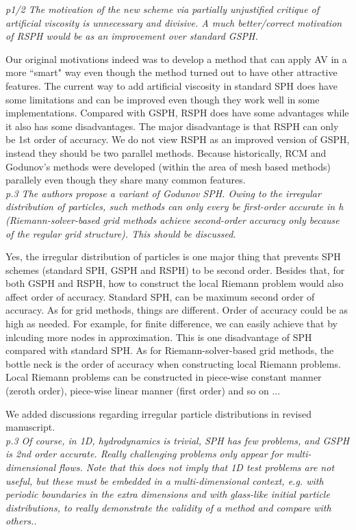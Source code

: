 \documentclass[10pt,a4paper]{article}
\begin{document}
\textit{p1/2 The motivation of the new scheme via partially unjustified critique of artificial viscosity is unnecessary and divisive. A much
better/correct motivation of RSPH would be as an improvement over standard GSPH.}

Our original motivations indeed was to develop a method that can apply AV in a more ``smart" way even though the method turned out to have other attractive features.
The current way to add artificial viscosity in standard SPH does have some limitations and can be improved even though they work well in some implementations.
Compared with GSPH, RSPH does have some advantages while it also has some disadvantages. The major disadvantage is that RSPH can only be 1st order of accuracy.
We do not view RSPH as an improved version of GSPH, instead they should be two parallel methods. Because historically, RCM and Godunov's methods were developed (within the area of mesh based methods) parallely even though they share many common features.
\\[3pt]

\textit{p.3 The authors propose a variant of Godunov SPH. Owing to the irregular distribution of particles, such methods can only every be first-order accurate in h (Riemann-solver-based grid methods achieve second-order accuracy only because of the regular grid structure). This should be discussed.}

Yes, the irregular distribution of particles is one  major thing that prevents SPH schemes (standard SPH, GSPH and RSPH) to be second order. Besides that, for both GSPH and RSPH, how to construct the local Riemann problem would also affect order of accuracy. 
Standard SPH, can be maximum second order of accuracy. As for grid methods, things are different. Order of accuracy could be as high as needed. For example, for finite difference, we can easily achieve that by inlcuding more nodes in approximation. This is one disadvantage of SPH compared with standard SPH. As for Riemann-solver-based grid methods, the bottle neck is the order of accuracy when constructing local Riemann problems. Local Riemann problems can be constructed in piece-wise constant manner (zeroth order), piece-wise linear manner (first order) and so on ...

We added discussions regarding irregular particle distributions in revised manuscript.
\\[3pt]

\textit{p.3 Of course, in 1D, hydrodynamics is trivial, SPH has few problems, and
GSPH is 2nd order accurate. Really challenging problems only appear for multi-dimensional flows. Note that this does not imply that 1D test
problems are not useful, but these must be embedded in a multi-dimensional context, e.g. with periodic boundaries in the extra dimensions and with glass-like initial particle distributions, to really
demonstrate the validity of a method and compare with others..}
\end{document}
